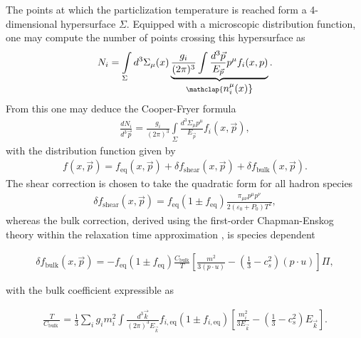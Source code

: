 The points at which the particlization temperature is reached form a 4-dimensional hypersurface $\Sigma$. Equipped with a microscopic distribution function, one may compute the number of points crossing this hypersurface as
\begin{align*}
    N_{i}=\int\limits_{\Sigma} d^{3} \Sigma_{\mu}(x)  \underbrace{\frac{g_i}{(2 \pi)^{3}}\int\frac{d^3\vec{p}}{E_{\vec{p}}} p^{\mu} f_{i}(x, p)}_{\mathclap{\textstyle n_i^\mu(x)}}.
\end{align*}
From this one may deduce the {\sffamily\color{ming} Cooper-Fryer} formula\cite{cooperfryer}
\begin{align*}
    \frac{d N_i}{d^{3} \vec{p}}=\frac{g_i}{(2 \pi)^{3}} \int\limits_{\Sigma}   \frac{d^{3}\Sigma_{\mu}p^{\mu}}{E_{\vec{p}}}f_i(x,\vec{p}) ,
\end{align*}
with the distribution function given by
\begin{align*}
    f(x,\vec{p})=f_\text{eq}(x,\vec{p})+\delta f_\text{shear}(x,\vec{p})+\delta f_\text{bulk}(x,\vec{p}).
\end{align*}
The shear correction is chosen to take the quadratic form \cite{dusling} for all hadron species
\begin{align*}
    \delta f_{\text {shear}}(x, \vec{p})=f_\text{eq}\left(1\pm f_\text{eq}\right) \frac{\pi_{\mu \nu} p^{\mu} p^{\nu}}{2\left(\varepsilon_{0}+P_{0}\right) T^{2}},
\end{align*}
whereas the bulk correction, derived using the first-order Chapman-Enskog theory within the relaxation time approximation \cite{paquetbulk, bozek}, is species dependent
\begin{fullwidth}
\begin{align*}
    \delta f_{\text {bulk}}(x, \vec{p})=-f_\text{eq}\left(1\pm f_\text{eq}\right) \frac{C_{\text {bulk}}}{T}\left[\frac{m^{2}}{3(p \cdot u)}-\left(\frac{1}{3}-c_{s}^{2}\right)(p \cdot u)\right] \Pi,
\end{align*}
\end{fullwidth}
with the bulk coefficient expressible as
\begin{fullwidth}
\begin{align*}
    \frac{T}{C_{\text {bulk }}}=\frac{1}{3} \sum_{i} g_{i} m_{i}^{2} \int \frac{d^{3} \vec{k}}{(2 \pi)^{3} E_{\vec{k}}} f_{i, \text{eq}}\left(1 \pm f_{i, \text{eq}}\right)\left[\frac{m_{i}^{2}}{3 E_{\vec{k}}}-\left(\frac{1}{3}-c_{s}^{2}\right) E_{\vec{k}}\right].
\end{align*}
\end{fullwidth}
